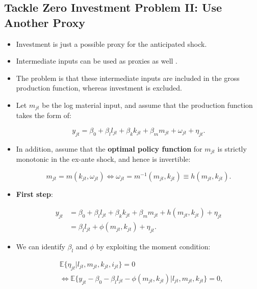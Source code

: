 \documentclass[]{book}
\providecommand{\tightlist}{%
  \setlength{\itemsep}{0pt}\setlength{\parskip}{0pt}}
\begin{document}
\subsection{Tackle Zero Investment Problem II: Use Another
Proxy}\label{tackle-zero-investment-problem-ii-use-another-proxy}

\begin{itemize}
\tightlist
\item
  Investment is just a possible proxy for the anticipated shock.
\item
  Intermediate inputs can be used as proxies as well
  \citep{Levinsohn2003}.
\item
  The problem is that these intermediate inputs are included in the
  gross production function, whereas investment is excluded.
\item
  Let \(m_{jt}\) be the log material input, and assume that the
  production function takes the form of:

  \begin{equation}
  y_{jt} = \beta_0 + \beta_l l_{jt} + \beta_k k_{jt} + \beta_m m_{jt} + \omega_{jt} + \eta_{jt}.
  \end{equation}
\item
  In addition, assume that the \textbf{optimal policy function} for
  \(m_{jt}\) is strictly monotonic in the ex-ante shock, and hence is
  invertible:

  \begin{equation}
  m_{jt} = m(k_{jt}, \omega_{jt}) \Leftrightarrow \omega_{jt} = m^{-1}(m_{jt}, k_{jt}) \equiv h(m_{jt}, k_{jt}). \label{eq:material}
  \end{equation}
\item
  \textbf{First step}:

  \begin{equation}
  \begin{split}
  y_{jt} &= \beta_0 + \beta_l l_{jt} + \beta_k k_{jt} + \beta_m m_{jt} + h(m_{jt}, k_{jt}) + \eta_{jt}\\
  &= \beta_l l_{jt} + \phi(m_{jt}, k_{jt}) + \eta_{jt}.
  \end{split}
  \end{equation}
\item
  We can identify \(\beta_l\) and \(\phi\) by exploiting the moment
  condition:

  \begin{equation}
  \begin{split}
  & \mathbb{E}\{\eta_{jt}|l_{jt}, m_{jt}, k_{jt}, i_{jt}\} = 0\\
  & \Leftrightarrow \mathbb{E}\{y_{jt} - \beta_0 - \beta_l l_{jt} - \phi(m_{jt}, k_{jt}) |l_{jt}, m_{jt}, k_{jt}\} = 0,
  \end{split}
  \end{equation}


\end{itemize}
\end{document}
